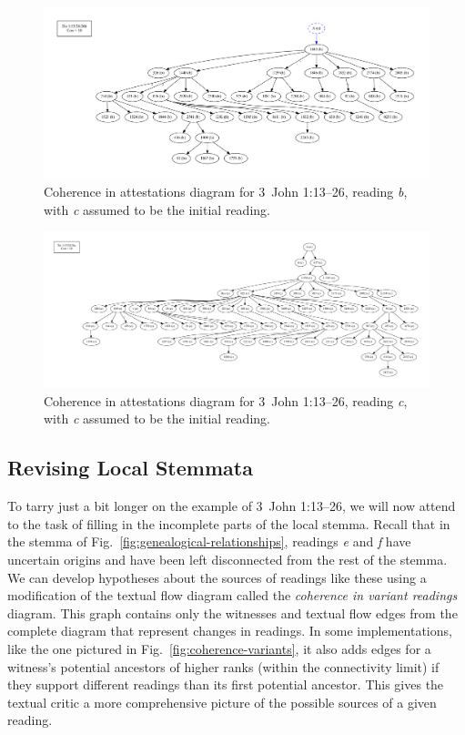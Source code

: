 \documentclass[a4paper, 12pt]{article}
\begin{document}
	\begin{figure}
		\centering
		\includegraphics[scale=0.3333]{../graphics/B25K1V13U24-26Rb-coherence-attestations-3.pdf}
		\caption{Coherence in attestations diagram for 3~John 1:13–26, reading \emph{b}, with \emph{c} assumed to be the initial reading.}
		\label{fig:coherence-b-3}
	\end{figure}
	
	\begin{figure}
		\centering
		\includegraphics[scale=0.3333]{../graphics/B25K1V13U24-26Rc-coherence-attestations-3.pdf}
		\caption{Coherence in attestations diagram for 3~John 1:13–26, reading \emph{c}, with \emph{c} assumed to be the initial reading.}
		\label{fig:coherence-c-3}
	\end{figure}
	
	\newpage
	
	\subsection{Revising Local Stemmata}\label{subsec:revising-local-stemmata}
	To tarry just a bit longer on the example of 3~John 1:13–26, we will now attend to the task of filling in the incomplete parts of the local stemma. Recall that in the stemma of Fig.~\ref{fig:genealogical-relationships}, readings \emph{e} and \emph{f} have uncertain origins and have been left disconnected from the rest of the stemma. We can develop hypotheses about the sources of readings like these using a modification of the textual flow diagram called the \emph{coherence in variant readings} diagram. This graph contains only the witnesses and textual flow edges from the complete diagram that represent changes in readings. In some implementations, like the one pictured in Fig.~\ref{fig:coherence-variants}, it also adds edges for a witness's potential ancestors of higher ranks (within the connectivity limit) if they support different readings than its first potential ancestor. This gives the textual critic a more comprehensive picture of the possible sources of a given reading.
	
\end{document}

